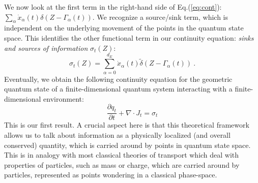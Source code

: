 \documentclass[draft,nofootinbib,pre,twocolumn,showpacs,showkeys,preprintnumbers,floatfix]{revtex4-1}
\newcommand{\1}{\mathbbm{1}}
\begin{document}
We now look at the first term in the right-hand side of Eq.(\ref{eq:cont}): $\sum_\alpha \dot{x}_\alpha(t) \delta(Z-\Gamma_\alpha(t))$.
We recognize a source/sink term, which is independent on the underlying movement of
the points in the quantum state space. This identifies the other functional term in our continuity 
equation: \emph{sinks and sources of information} $\sigma_t(Z)$:
\begin{equation}
\sigma_t(Z) = \sum_{\alpha=0}^{d_E} \dot{x}_\alpha(t) \widetilde{\delta}\left(Z - \Gamma_\alpha(t) \right)~.\label{eq:sigma}
\end{equation}
Eventually, we obtain the following continuity equation for the geometric quantum state of a finite-dimensional
quantum system interacting with a finite-dimensional environment:
\begin{equation}
\frac{\partial q_t}{\partial t} + \nabla \cdot J_t = \sigma_t\label{eq:continuity}
\end{equation}
This is our first result. A crucial aspect here is that this theoretical framework allows us to talk about information 
as a physically localized (and overall conserved) quantity, which is carried around by points in quantum state space.
This is in analogy with most classical theories of transport which deal with properties of particles, such as mass 
or charge, which are carried around by particles, represented as points wondering in a classical phase-space.
\end{document}
